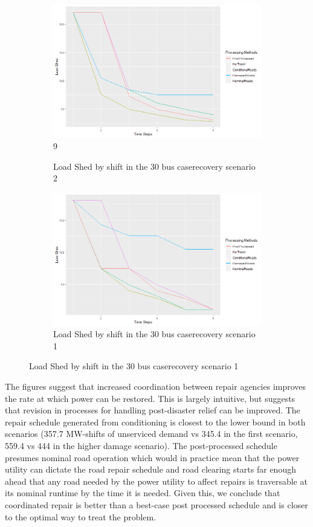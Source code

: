 \documentclass[10pt]{article}
\begin{document}
\begin{figure}
	\centering
	\begin{subfigure}{.5\textwidth}
		\centering
		\includegraphics[width=.9\linewidth]{Rplot30Scenario2.png}9
		\caption{Load Shed by shift in the 30 bus case\newline recovery scenario 2}
		\label{fig:sub1}
	\end{subfigure}%
	\begin{subfigure}{.5\textwidth}
		\centering
		\includegraphics[width=.9\linewidth]{Rplot37.png}
		\caption{Load Shed by shift in the 30 bus case\newline recovery scenario 1}
		\label{fig:sub2}
	\end{subfigure}

\end{figure}
The figures suggest that increased coordination between repair agencies improves the rate at which power can be restored. This is largely intuitive, but suggests that revision in processes for handling post-disaster relief can be improved. The repair schedule generated from conditioning is closest to the lower bound in both scenarios (357.7 MW-shifts of unserviced demand vs 345.4 in the first scenario, 559.4 vs 444 in the higher damage scenario). The post-processed schedule presumes nominal road operation which would in practice mean that the power utility can dictate the road repair schedule and road clearing starts far enough ahead that any road needed by the power utility to affect repairs is traversable at its nominal runtime by the time it is needed. Given this, we conclude that coordinated repair is better than a best-case post processed schedule and is closer to the optimal way to treat the problem.
\end{document}
